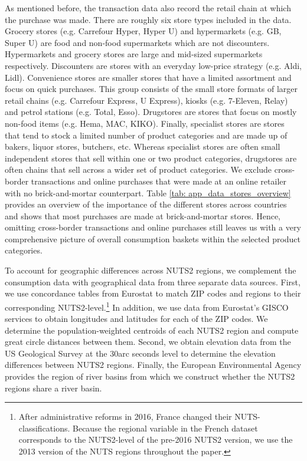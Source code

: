 As mentioned before, the transaction data also record the retail chain at which the purchase was made. There are roughly six store types included in the data. Grocery stores (e.g. Carrefour Hyper, Hyper U) and hypermarkets (e.g. GB, Super U) are food and non-food supermarkets which are not discounters. Hypermarkets and grocery stores are large and mid-sized supermarkets respectively. Discounters are stores with an everyday low-price strategy (e.g. Aldi, Lidl). Convenience stores are smaller stores that have a limited assortment and focus on quick purchases. This group consists of the small store formats of larger retail chains (e.g. Carrefour Express, U Express), kiosks (e.g. 7-Eleven, Relay) and petrol stations (e.g. Total, Esso). Drugstores are stores that focus on mostly non-food items (e.g. Hema, MAC, KIKO). Finally, specialist stores are stores that tend to stock a limited number of product categories and are made up of bakers, liquor stores, butchers, etc. Whereas specialist stores are often small independent stores that sell within one or two product categories, drugstores are often chains that sell across a wider set of product categories. We exclude cross-border transactions and online purchases that were made at an online retailer with no brick-and-mortar counterpart. Table \ref{tab: app_data_stores_overview} provides an overview of the importance of the different stores across countries and shows that most purchases are made at brick-and-mortar stores. Hence, omitting cross-border transactions and online purchases still leaves us with a very comprehensive picture of overall consumption baskets within the selected product categories. 

To account for geographic differences across NUTS2 regions, we complement the consumption data with geographical data from three separate data sources. First, we use concordance tables from Eurostat to match ZIP codes and regions to their corresponding NUTS2-level.\footnote{After administrative reforms in 2016, France changed their NUTS-classifications. Because the regional variable in the French dataset corresponds to the NUTS2-level of the pre-2016 NUTS2 version, we use the 2013 version of the NUTS regions throughout the paper.} In addition, we use data from Eurostat's GISCO services to obtain longitudes and latitudes for each of the ZIP codes. We determine the population-weighted centroids of each NUTS2 region and compute great circle distances between them. Second, we obtain elevation data from the US Geological Survey at the 30arc seconds level to determine the elevation differences between NUTS2 regions. Finally, the European Environmental Agency provides the region of river basins from which we construct whether the NUTS2 regions share a river basin. 